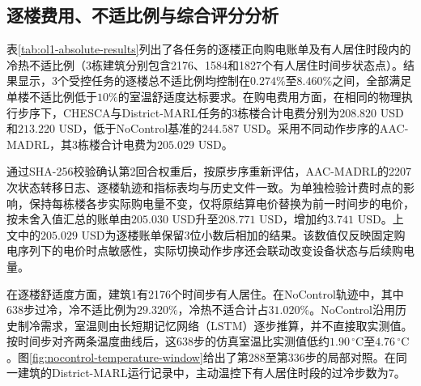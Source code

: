 \subsection{逐楼费用、不适比例与综合评分分析}
表\ref{tab:ol1-absolute-results}列出了各任务的逐楼正向购电账单及有人居住时段内的冷热不适比例（3栋建筑分别包含2176、1584和1827个有人居住时间步状态点）。结果显示，3个受控任务的逐楼总不适比例均控制在$0.274\%$至$8.460\%$之间，全部满足单楼不适比例低于$10\%$的室温舒适度达标要求。在购电费用方面，在相同的物理执行步序下，CHESCA与District-MARL任务的3栋楼合计电费分别为$208.820\text{ USD}$和$213.220\text{ USD}$，低于NoControl基准的$244.587\text{ USD}$。采用不同动作步序的AAC-MADRL，其3栋楼合计电费为$205.029\text{ USD}$。

通过SHA-256校验确认第2回合权重后，按原步序重新评估，AAC-MADRL的2207次状态转移日志、逐楼轨迹和指标表均与历史文件一致。为单独检验计费时点的影响，保持每栋楼各步实际购电量不变，仅将原结算电价替换为前一时间步的电价，按未舍入值汇总的账单由$205.030\text{ USD}$升至$208.771\text{ USD}$，增加约$3.741\text{ USD}$。上文中的$205.029\text{ USD}$为逐楼账单保留3位小数后相加的结果。该数值仅反映固定购电序列下的电价时点敏感性，实际切换动作步序还会联动改变设备状态与后续购电量。

在逐楼舒适度方面，建筑1有2176个时间步有人居住。在NoControl轨迹中，其中638步过冷，冷不适比例为$29.320\%$，冷热不适合计占$31.020\%$。NoControl沿用历史制冷需求，室温则由长短期记忆网络（LSTM）逐步推算，并不直接取实测值。按时间步对齐两条温度曲线后，这638步的仿真室温比实测值低约$1.90\,^{\circ}\mathrm{C}$至$4.76\,^{\circ}\mathrm{C}$。图\ref{fig:nocontrol-temperature-window}给出了第288至第336步的局部对照。在同一建筑的District-MARL运行记录中，主动温控下有人居住时段的过冷步数为7。

